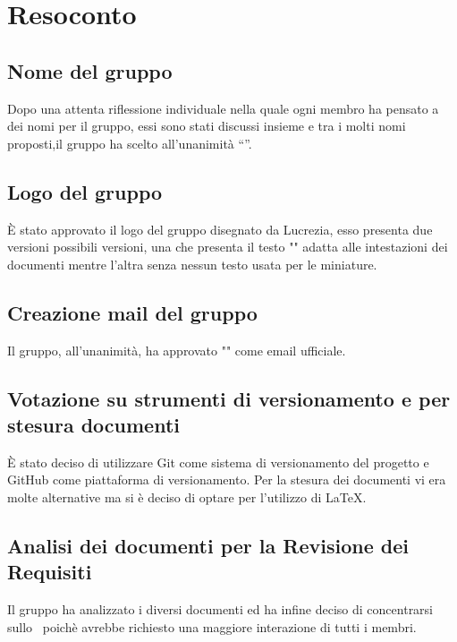 \newpage

\section{Resoconto}

\subsection{Nome del gruppo}

Dopo una attenta riflessione individuale nella quale ogni membro ha pensato a dei nomi per il gruppo, essi sono stati discussi insieme e tra i molti nomi proposti,il gruppo ha scelto all’unanimità “\textit{\Gruppo{}}”.

\subsection{Logo del gruppo}

È stato approvato il logo del gruppo disegnato da Lucrezia, esso presenta due versioni possibili versioni, una che presenta il testo "\Gruppo{}" adatta alle intestazioni dei documenti mentre l'altra senza nessun testo usata per le miniature.

\subsection{Creazione mail del gruppo}

Il gruppo, all'unanimità, ha approvato "\textit{\Mail{}}" come email ufficiale.

\subsection{Votazione su strumenti di versionamento e per stesura documenti}

È stato deciso di utilizzare Git come sistema di versionamento del progetto e GitHub come piattaforma di versionamento. Per la stesura dei documenti vi era molte alternative ma si è deciso di optare per l'utilizzo di \LaTeX.


\subsection{Analisi dei documenti per la Revisione dei Requisiti}

Il gruppo ha analizzato i diversi documenti ed ha infine deciso di concentrarsi sullo \SdF\ poichè avrebbe richiesto una maggiore interazione di tutti i membri.

